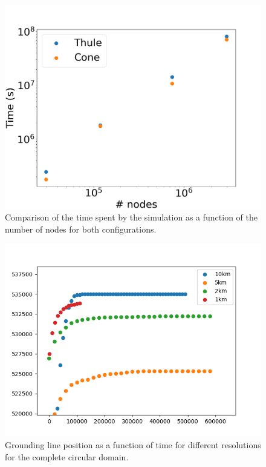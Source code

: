 \documentclass{article}
\begin{document}
	\begin{figure}[!h]
	\centering
	\includegraphics[width=0.9\linewidth]{../fig/TimeVsNumberOfNodes.png}
	\caption{Comparison of the time spent by the simulation as a function of the number of nodes for both configurations.}
	\label{TimeVsNumberofnodes}
	\end{figure}

	\begin{figure}[!h]
	\centering
	\includegraphics[width=0.9\linewidth]{../fig/Grounding_line_integrated_full_domain_CONE_time.png}
	\caption{Grounding line position as a function of time for different resolutions for the complete circular domain.}
	\label{TimeVsGroundingLinePosition_full}
	\end{figure}
\end{document}
